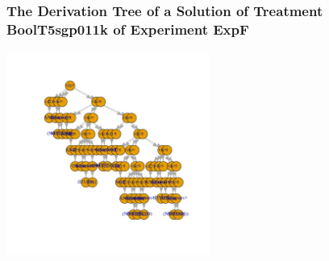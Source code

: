  \begin{frame}
 \frametitle{ The Derivation Tree of a Solution of Treatment BoolT5sgp011k of Experiment ExpF }
 \begin{center}
\includegraphics[width=0.5\textwidth, angle=0]
{ExpFDerivationTreeFigure009.pdf}
 \end{center}
 \label{templateReport/ExpFDerivationTreeFigure009.pdf}  
 \end{frame}

